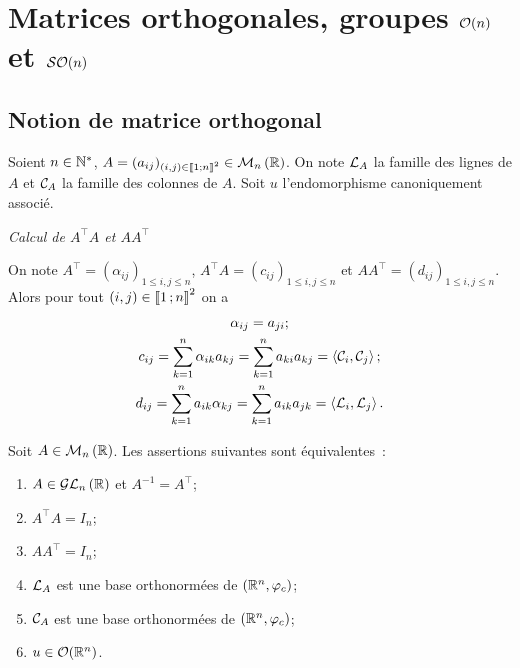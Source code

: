 \section{Matrices orthogonales, groupes $\mathcal{O}\!\left(n\right)$ et $\mathcal{SO}\!\left(n\right)$}

\subsection{Notion de matrice orthogonal}

Soient $n \in \mathbb{N}^*$, $A=(a_{ij})_{(i,j) \in \mathopen{\llbracket}1\mathclose{}\mathpunct{};n\mathclose{\rrbracket}^2} \in \mathcal{M}_{n}\left(\mathbb{R}\right)$. On note $\mathcal{L}_A$ la famille des lignes de $A$ et $\mathcal{C}_A$ la famille des colonnes de $A$. Soit $u$ l'endomorphisme canoniquement associé.

\emph{Calcul de $A^\top A$ et $A A^\top$}

On note $A^\top = (\alpha_{ij})_{1\leqslant i,j \leqslant n}$, $A^\top A= (c_{ij})_{1\leqslant i,j \leqslant n}$ et $A A^\top=(d_{ij})_{1\leqslant i,j \leqslant n}$. Alors pour tout $(i,j) \in \mathopen{\llbracket}1\mathclose{}\mathpunct{};n\mathclose{\rrbracket}^2$ on a
\begin{gather}
  \alpha_{ij}=a_{ji};\\
  c_{ij} = \sum_{k=1}^n \alpha_{ik}a_{kj}=\sum_{k=1}^n a_{ki}a_{kj} = \left\langle{\mathcal{C}_i},{\mathcal{C}_j}\right\rangle;\\
 d_{ij} = \sum_{k=1}^n a_{ik}\alpha_{kj}=\sum_{k=1}^n a_{ik}a_{jk} = \left\langle{\mathcal{L}_i},{\mathcal{L}_j}\right\rangle.
\end{gather}
\begin{theo}
  Soit $A \in \mathcal{M}_{n}\left(\mathbb{R}\right)$. Les assertions suivantes sont équivalentes~:
  \begin{enumerate}
  \item $A \in \mathcal{GL}_{n}\left(\mathbb{R}\right)$ et $A^{-1}=A^\top$;
  \item $A^\top A = I_n$;
  \item $A A^\top = I_n$;
  \item $\mathcal{L}_A$ est une base orthonormées de $(\mathbb{R}^n, \varphi_c)$;
  \item $\mathcal{C}_A$ est une base orthonormées de $(\mathbb{R}^n, \varphi_c)$;
  \item $u \in \mathcal{O}\!\left(\mathbb{R}^n\right)$.
  \end{enumerate}
\end{theo}
